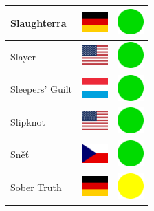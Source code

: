 \documentclass[12pt, a4paper, twoside]{report}
\begin{document}
\begin{center}
\begin{longtable}{|p{5cm}|p{2cm}|p{2cm}|}
 Slaughterra                                                & \includegraphics[width=1cm]{../4x3/de} &   \includegraphics[width=1cm]{../likes/y} \\ \hline
 Slayer                                                     & \includegraphics[width=1cm]{../4x3/us} &   \includegraphics[width=1cm]{../likes/y} \\ \hline
 Sleepers' Guilt                                            & \includegraphics[width=1cm]{../4x3/lu} &   \includegraphics[width=1cm]{../likes/y} \\ \hline
 Slipknot                                                   & \includegraphics[width=1cm]{../4x3/us} &   \includegraphics[width=1cm]{../likes/y} \\ \hline
 Sněť                                                       & \includegraphics[width=1cm]{../4x3/cz} &   \includegraphics[width=1cm]{../likes/y} \\ \hline
 Sober Truth                                                & \includegraphics[width=1cm]{../4x3/de} &   \includegraphics[width=1cm]{../likes/m} \\ \hline

\end{longtable}
\end{center}
\end{document}
